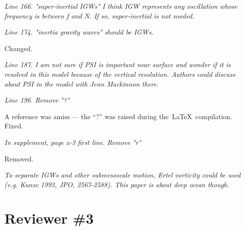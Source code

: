 \documentclass[11pt]{article}
\newcommand{\bdp}{\begin{description}}
\newcommand{\edp}{\end{description}}
\begin{document}
\begin{enumerate}

\item {\it Line 166. "super-inertial IGWs" I think IGW represents any oscillation whose
                frequency is between f and N. If so, super-inertial is not needed.}

\item {\it Line 174. "inertia gravity waves" should be IGWs.}

\bdp
   \item Changed.
\edp

\item {\it Line 187. I am not sure if PSI is important near surface and wonder if it
                is resolved in this model because of the vertical resolution.
                Authors could discuss about PSI in the model with Jenn Mackinnon there.}

\item {\it Line 196. Remove "?"}

\bdp
  \item A reference  was amiss --- the ``?'' was raised during the\, \LaTeX\, compilation. Fixed.
\edp

\item {\it In supplement, page x-3 first line. Remove "r"}

\bdp
  \item Removed.
\edp

\item {\it To separate IGWs and other submesoscale motion, Ertel vorticity could be
      used (e.g. Kunze 1993, JPO, 2567-2588). This paper is about deep ocean though.}


\end{enumerate}

\section{Reviewer \#3}



\end{document}
